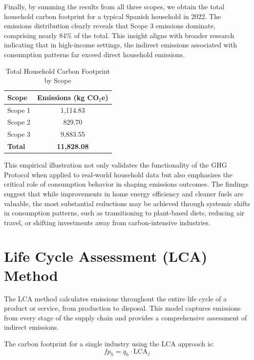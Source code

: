 \documentclass[12pt,a4paper]{article}%
\begin{document}
Finally, by summing the results from all three scopes, we obtain the total household carbon footprint for a typical Spanish household in 2022. The emissions distribution clearly reveals that Scope 3 emissions dominate, comprising nearly 84\% of the total. This insight aligns with broader research indicating that in high-income settings, the indirect emissions associated with consumption patterns far exceed direct household emissions.


\begin{table}[h]
\centering
\caption{Total Household Carbon Footprint by Scope}\label{tab:total_emissions}
\begin{tabular}{lc}
\toprule
\textbf{Scope} & \textbf{Emissions (kg CO$_2$e)} \\
\midrule
Scope 1 & 1,114.83 \\
Scope 2 &   829.70 \\
Scope 3 & 9,883.55 \\
\midrule
\textbf{Total} & \textbf{11,828.08} \\
\bottomrule
\end{tabular}
\end{table}


This empirical illustration not only validates the functionality of the GHG Protocol when applied to real-world household data but also emphasizes the critical role of consumption behavior in shaping emissions outcomes. The findings suggest that while improvements in home energy efficiency and cleaner fuels are valuable, the most substantial reductions may be achieved through systemic shifts in consumption patterns, such as transitioning to plant-based diets, reducing air travel, or shifting investments away from carbon-intensive industries.
\section{Life Cycle Assessment (LCA) Method}
The LCA method calculates emissions throughout the entire life cycle of a product or service, from production to disposal. This model captures emissions from every stage of the supply chain and provides a comprehensive assessment of indirect emissions.

The carbon footprint for a single industry using the LCA approach is:
\begin{equation}
   fp_h = q_h \cdot \text{LCA}_j 
\end{equation}
\end{document}
